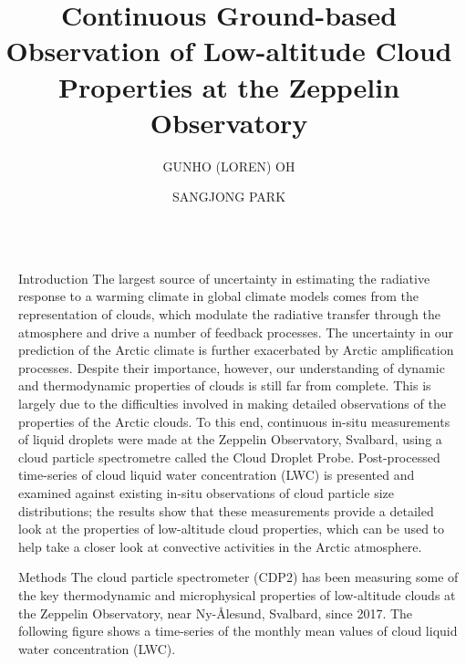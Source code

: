 \documentclass[final]{beamer}
\title{Continuous Ground-based Observation of Low-altitude Cloud Properties at the Zeppelin Observatory}
\author{GUNHO (LOREN) OH \inst{1} \and SANGJONG PARK \inst{1}}
\institute[shortinst]{\inst{1} Korea Polar Research Institute (KOPRI)}
\newlength{\sepwidth}
\newlength{\colwidth}
\newcommand{\separatorcolumn}{\begin{column}{\sepwidth}\end{column}}
\begin{document}
\begin{frame}[t]
\begin{columns}[t]
\separatorcolumn

\begin{column}{\colwidth}

  \begin{alertblock}{Introduction}
    The largest source of uncertainty in estimating the radiative response to a warming climate in global climate models comes from the representation of clouds, which modulate the radiative transfer through the atmosphere and drive a number of feedback processes. The uncertainty in our prediction of the Arctic climate is further exacerbated by Arctic amplification processes. Despite their importance, however, our understanding of dynamic and thermodynamic properties of clouds is still far from complete. This is largely due to the difficulties involved in making detailed observations of the properties of the Arctic clouds. To this end, continuous in-situ measurements of liquid droplets were made at the Zeppelin Observatory, Svalbard, using a cloud particle spectrometre called the Cloud Droplet Probe. Post-processed time-series of cloud liquid water concentration (LWC) is presented and examined against existing in-situ observations of cloud particle size distributions; the results show that these measurements provide a detailed look at the properties of low-altitude cloud properties, which can be used to help take a closer look at convective activities in the Arctic atmosphere.
  \end{alertblock}

  \begin{block}{Methods}
    The cloud particle spectrometer (CDP2) has been measuring some of the key thermodynamic and microphysical properties of low-altitude clouds at the Zeppelin Observatory, near Ny-\r{A}lesund, Svalbard, since 2017. The following figure shows a time-series of the monthly mean values of cloud liquid water concentration (LWC).


\end{block}
\end{column}
\end{columns}
\end{frame}
\end{document}
